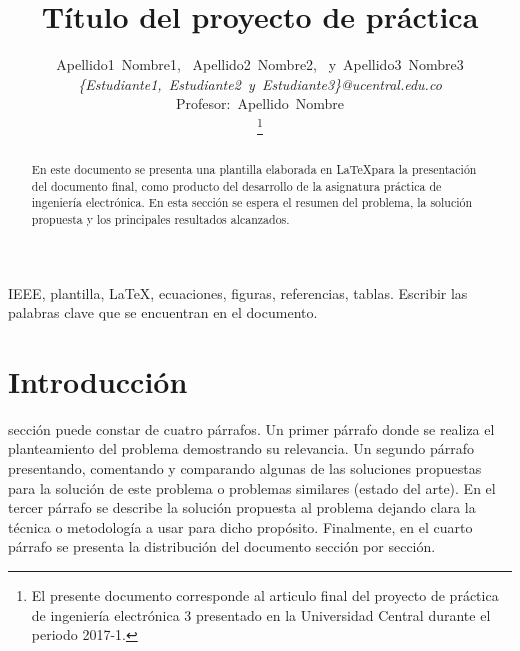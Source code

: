 \documentclass[journal]{IEEEtran}
\begin{document}
\title{Título del proyecto de práctica}
\author{Apellido1~Nombre1,~
        Apellido2~Nombre2,~
        y~Apellido3~Nombre3\\
				\textit{\{Estudiante1,~Estudiante2~y~Estudiante3\}@ucentral.edu.co}\\
				Profesor:~Apellido~Nombre\\%
\thanks{El presente documento corresponde al articulo final del proyecto de práctica de ingeniería electrónica 3 presentado en la Universidad Central durante el periodo 2017-1.}} %

\maketitle

\begin{abstract}
En este documento se presenta una plantilla elaborada en \LaTeX para la presentación del documento final, como producto del desarrollo de la asignatura práctica de ingeniería electrónica. En esta sección se espera el resumen del problema, la solución propuesta y los principales resultados alcanzados.
\end{abstract}
\begin{IEEEkeywords}
IEEE, plantilla, \LaTeX, ecuaciones, figuras, referencias, tablas. Escribir las palabras clave que se encuentran en el documento.
\end{IEEEkeywords}
\section{Introducción}
 sección puede constar de cuatro párrafos. Un primer párrafo donde se realiza el planteamiento del problema demostrando su relevancia. Un segundo párrafo presentando, comentando y comparando algunas de las soluciones propuestas para la solución de este problema o problemas similares (estado del arte). En el tercer párrafo se describe la solución propuesta al problema dejando clara la técnica o metodología a usar para dicho propósito. Finalmente, en el cuarto párrafo se presenta la distribución del documento sección por sección.
\end{document}
